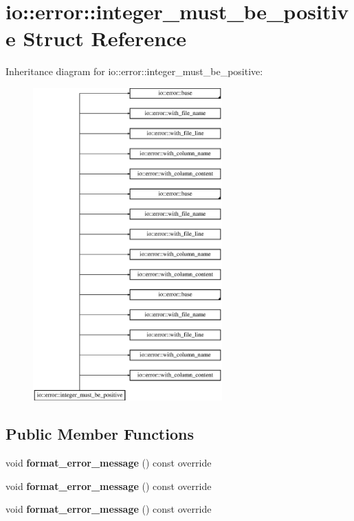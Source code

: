 \hypertarget{structio_1_1error_1_1integer__must__be__positive}{}\section{io\+:\+:error\+:\+:integer\+\_\+must\+\_\+be\+\_\+positive Struct Reference}
\label{structio_1_1error_1_1integer__must__be__positive}
Inheritance diagram for io\+:\+:error\+:\+:integer\+\_\+must\+\_\+be\+\_\+positive\+:\begin{figure}[H]
\begin{center}
\leavevmode
\includegraphics[height=12.000000cm]{da/d64/structio_1_1error_1_1integer__must__be__positive}
\end{center}
\end{figure}
\subsection*{Public Member Functions}
\begin{DoxyCompactItemize}
\item 
\mbox{\label{structio_1_1error_1_1integer__must__be__positive_ac10ca4340da4f698a4541e0d793a804d}} 
void {\bfseries format\+\_\+error\+\_\+message} () const override
\item 
\mbox{\label{structio_1_1error_1_1integer__must__be__positive_ac10ca4340da4f698a4541e0d793a804d}} 
void {\bfseries format\+\_\+error\+\_\+message} () const override
\item 
\mbox{\label{structio_1_1error_1_1integer__must__be__positive_ac10ca4340da4f698a4541e0d793a804d}} 
void {\bfseries format\+\_\+error\+\_\+message} () const override
\end{DoxyCompactItemize}
